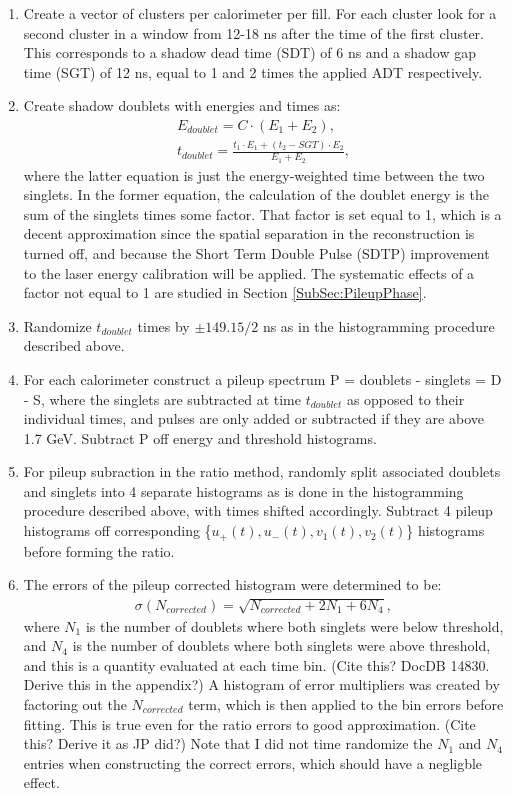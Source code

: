 	\begin{enumerate}
		\item{Create a vector of clusters per calorimeter per fill. For each cluster look for a second cluster in a window from 12-18 ns after the time of the first cluster. This corresponds to a shadow dead time (SDT) of 6 ns and a shadow gap time (SGT) of 12 ns, equal to 1 and 2 times the applied ADT respectively.}
		\item{Create shadow doublets with energies and times as:
			\begin{gather}
				E_{doublet} = C \cdot (E_{1} + E_{2}), \\
				t_{doublet} = \frac{t_{1} \cdot E_{1} + (t_{2}-SGT) \cdot E_{2}}{E_{1} + E_{2}},
			\end{gather}
		where the latter equation is just the energy-weighted time between the two singlets. In the former equation, the calculation of the doublet energy is the sum of the singlets times some factor. That factor is set equal to 1, which is a decent approximation since the spatial separation in the reconstruction is turned off, and because the Short Term Double Pulse (SDTP) improvement to the laser energy calibration will be applied. The systematic effects of a factor not equal to 1 are studied in Section \ref{SubSec:PileupPhase}.}
		\item{Randomize $t_{doublet}$ times by $\pm 149.15/2$ ns as in the histogramming procedure described above.}
		\item{For each calorimeter construct a pileup spectrum P = doublets - singlets = D - S, where the singlets are subtracted at time $t_{doublet}$ as opposed to their individual times, and pulses are only added or subtracted if they are above 1.7 GeV. Subtract P off energy and threshold histograms.}
		\item{For pileup subraction in the ratio method, randomly split associated doublets and singlets into 4 separate histograms as is done in the histogramming procedure described above, with times shifted accordingly. Subtract 4 pileup histograms off corresponding \{$u_{+}(t), u_{-}(t), v_{1}(t), v_{2}(t)$\} histograms before forming the ratio.}
		\item{The errors of the pileup corrected histogram were determined to be: 
			\begin{gather}
				\sigma(N_{corrected}) = \sqrt{N_{corrected} + 2 N_{1} + 6 N_{4}},
			\end{gather}
		where $N_{1}$ is the number of doublets where both singlets were below threshold, and $N_{4}$ is the number of doublets where both singlets were above threshold, and this is a quantity evaluated at each time bin. (Cite this? DocDB 14830. Derive this in the appendix?) A histogram of error multipliers was created by factoring out the $N_{corrected}$ term, which is then applied to the bin errors before fitting. This is true even for the ratio errors to good approximation. (Cite this? Derive it as JP did?) Note that I did not time randomize the $N_{1}$ and $N_{4}$ entries when constructing the correct errors, which should have a negligble effect.}

\end{enumerate}
